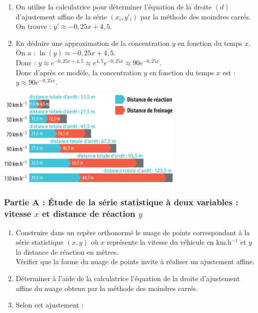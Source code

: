 \documentclass[a4paper,11pt,exos]{nsi} %
\begin{document}
{\begin{enumerate}
        Les points semblent alignés, donc le nuage de points peut être ajusté par une droite.
        \item On utilise la calculatrice pour déterminer l'équation de la droite $(d)$ d'ajustement affine de la série $(x_i,y'_i)$ par la méthode des moindres carrés.\\
        On trouve : $y'\approx -0,25x+4,5$.
        \item En déduire une approximation de la concentration $y$ en fonction du temps $x$.\\
        On a : $\ln(y)\approx -0,25x+4,5$.\\
        Donc : $y\approx e^{-0,25x+4,5}\approx e^{4,5}e^{-0,25x}
        \approx 90e^{-0,25x}$.\\
        Donc d'après ce modèle, la concentration $y$ en fonction du temps $x$ est :\\
        $y\approx 90e^{-0,25x}$.
    \end{enumerate}
}


{\includegraphics[width=9cm]{Ex50p242Sesamath.png}}

\subsubsection*{Partie A : Étude de la série statistique à deux variables : vitesse $x$ et distance de réaction $y$}
\begin{enumerate}
    \item Construire dans un repère orthonormé le nuage de points correspondant à la série statistique $(x,y)$ où $x$ représente la vitesse du véhicule en km.h$^{-1}$ et $y$ la distance de réaction en mètres.\\
    Vérifier que la forme du nuage de points invite à réaliser un ajustement affine.
    \item Déterminer à l'aide de la calculatrice l'équation de la droite d'ajustement affine du nuage obtenu par la méthode des moindres carrés.
    \item Selon cet ajustement :
\end{enumerate}
\end{document}
